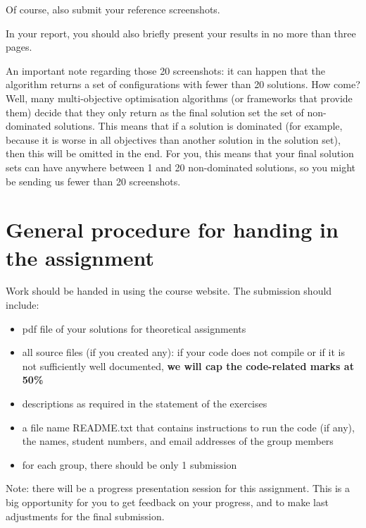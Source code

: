 \documentclass{pracs}
\begin{document}
Of course, also submit your reference screenshots.

In your report, you should also briefly present your results in no more than three pages.

An important note regarding those 20 screenshots: it can happen that the algorithm returns a set of configurations with fewer than 20 solutions. How come? Well, many multi-objective optimisation algorithms (or frameworks that provide them) decide that they only return as the final solution set the set of non-dominated solutions. This means that if a solution is dominated (for example, because it is worse in all objectives than another solution in the solution set), then this will be omitted in the end. For you, this means that your final solution sets can have anywhere between 1 and 20 non-dominated solutions, so you might be sending us fewer than 20 screenshots.


\section{General procedure for handing in the assignment}
Work should be handed in using the course website. The submission should include:
\begin{itemize}
\item pdf file of your solutions for theoretical assignments
\item all source files (if you created any): if your code does not compile or if it is not sufficiently well documented, \textbf{we will cap the code-related marks at 50\%}
\item descriptions as required in the statement of the exercises
\item a file name README.txt that contains instructions to run the code (if any), the names, student numbers, and email addresses of the group members
\item for each group, there should be only 1 submission
\end{itemize}

Note: there will be a progress presentation session for this assignment. This is a big opportunity for you to get feedback on your progress, and to make last adjustments for the final submission.
\end{document}
